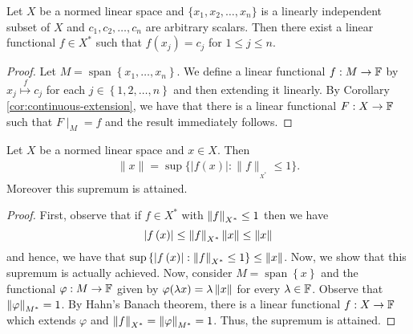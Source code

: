 \begin{corollary}
Let $X$ be a normed linear space and $\{x_1,x_2,\ldots,x_n\}$ is a linearly independent subset of $X$ and $c_1,c_2,\ldots,c_n$ are arbitrary scalars. Then there exist a linear functional $f\in X^*$ such that $f(x_j)=c_j$ for $1\leqslant j \leqslant n.$
\label{cor:lin-independent-HB}
\end{corollary}
\begin{proof}
    Let $M=\operatorname{span} \left\{ x_{1}, \ldots , x_{n} \right\}$. We define a linear functional $f : M \to \mathbb F$ by $x_{j} \stackrel{f}{\mapsto} c_{j}$ for each $j\in \left\{ 1,2,\ldots , n \right\}$ and then extending it linearly. By Corollary \ref{cor:continuous-extension}, we have that there is a linear functional $F : X \to \mathbb F$ such that $F\mid_{M} = f$ and the result immediately follows.
\end{proof}

\begin{corollary}
    Let $X$ be a normed linear space and $x\in X.$ Then
\begin{align*}
\|x\|= \sup \{ |f(x)| : \|f\|_{_{X^*}} \leqslant 1\}.
\end{align*}
Moreover this supremum is attained.
    \label{cor:the-dual-norm}
\end{corollary}
\begin{proof}
    First, observe that if $f\in X^{*}$ with $\left\lVert f \right\rVert_{X^{*}} \le 1$ then we have
    \begin{equation*}
	\left\lvert f\left( x \right) \right\rvert \le \left\lVert f \right\rVert_{X^{*}} \left\lVert x \right\rVert\le \left\lVert x \right\rVert
    \end{equation*}
    and hence, we have that $\sup \left\{ \left\lvert f\left( x \right) \right\rvert : \left\lVert f \right\rVert_{X^{*}} \le 1 \right\} \le \left\lVert x \right\rVert$. Now, we show that this supremum is actually achieved. Now, consider $M =\operatorname{span} \left\{ x \right\}$ and the functional $\varphi : M \to \mathbb F$ given by $\varphi (\lambda x) = \lambda \left\lVert x \right\rVert$ for every $\lambda \in \mathbb F$. Observe that $\left\lVert \varphi \right\rVert_{M^{*}}=1$. By Hahn's Banach theorem, there is a linear functional $f: X \to \mathbb F$ which extends $\varphi$ and $\left\lVert f \right\rVert_{X^{*}}=\left\lVert \varphi \right\rVert_{M^{*}} = 1$. Thus, the supremum is attained.
\end{proof}
